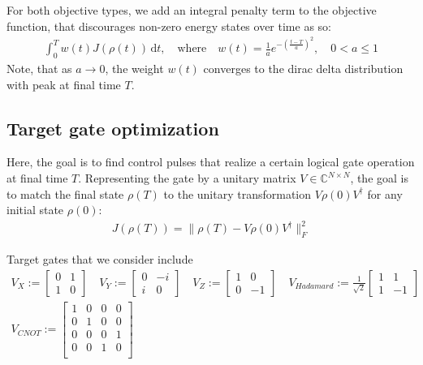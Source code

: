 \documentclass[letterpaper]{article}
\newcommand{\C}{\mathds{C}}
\begin{document}
For both objective types, we add an integral penalty term to the objective
function, that discourages non-zero energy states over time as so:
\begin{align}
  \int_0^T w(t) J(\rho(t)) \, \mathrm{d}t, \quad \text{where} \quad w(t) =
  \frac{1}{a} e^{ -\left(\frac{t-T}{a} \right)^2}, \quad  0 < a \leq 1
\end{align}
Note, that as $a\to 0$, the weight $w(t)$ converges to the dirac delta
distribution with peak at final time $T$. 

\subsection{Target gate optimization}

Here, the goal is to find control pulses that realize a certain logical gate
operation at final time $T$. Representing the gate by a unitary matrix $V\in
\C^{N\times N}$, the goal is to match the final state $\rho(T)$ to the unitary
transformation $V\rho(0)V^{\dagger}$ for any initial state $\rho(0)$:
\begin{align}
  J(\rho(T)) = \| \rho(T) - V\rho(0)V^{\dagger} \|^2_F 
\end{align} 


Target gates that we consider include
\begin{align}
  V_{X} := \begin{bmatrix} 0 & 1 \\ 1 & 0  \end{bmatrix} \quad
  V_{Y} := \begin{bmatrix} 0 & -i \\ i & 0 \end{bmatrix} \quad
  V_{Z} := \begin{bmatrix} 1 & 0 \\ 0 & -1 \end{bmatrix} \quad 
  V_{Hadamard} := \frac{1}{\sqrt{2}} 
           \begin{bmatrix} 1 & 1 \\ 1 & -1 \end{bmatrix} \\
  V_{CNOT} := \begin{bmatrix} 1  & 0 & 0 & 0 \\ 
                               0  & 1 & 0 & 0 \\ 
                               0  & 0 & 0 & 1 \\ 
                               0  & 0 & 1 & 0 \\ 
                \end{bmatrix}
\end{align}
\end{document}
